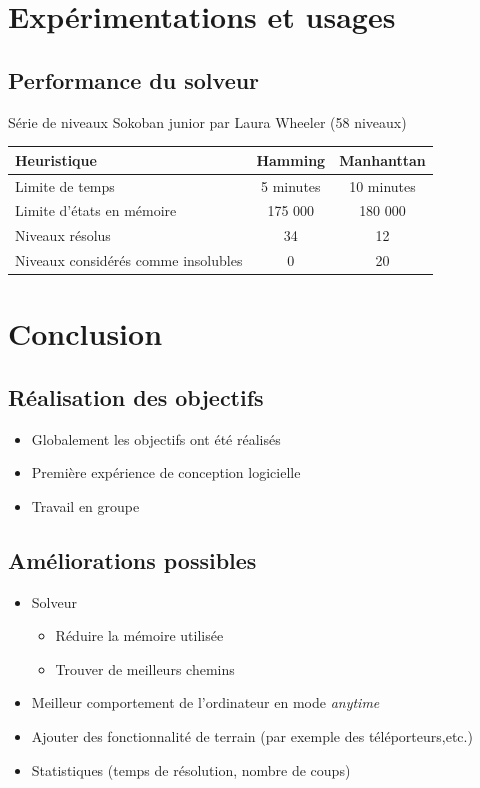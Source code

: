 \documentclass{beamer}
\begin{document}
\section{Expérimentations et usages}
\subsection{Performance du solveur}
\begin{frame}
  Série de niveaux Sokoban junior par Laura Wheeler (58 niveaux)
  \centering
  \begin{tabular}{|l|c|c|}
  \hline
  Heuristique                          & Hamming   & Manhanttan \\
  \hline
  Limite de temps                      & 5 minutes & 10 minutes \\
  \hline
  Limite d'états en mémoire            & 175 000   & 180 000    \\
  \hline
  Niveaux résolus                      &    34     &    12      \\
  \hline
  Niveaux considérés comme insolubles  &    0      &    20      \\
  \hline
  \end{tabular}
\end{frame}

\section{Conclusion}
\subsection{Réalisation des objectifs}
\begin{frame}
\begin{itemize}
\item Globalement les objectifs ont été réalisés
\item Première expérience de conception logicielle
\item Travail en groupe
\end{itemize}
\end{frame}

\subsection{Améliorations possibles}
\begin{frame}
\begin{itemize}
\item Solveur
\begin{itemize}
\item Réduire la mémoire utilisée
\item Trouver de meilleurs chemins
\end{itemize}
\item Meilleur comportement de l'ordinateur en mode \textit{anytime}
\item Ajouter des fonctionnalité de terrain (par exemple des téléporteurs,etc.)
\item Statistiques (temps de résolution, nombre de coups)
\end{itemize}
\end{frame}
\end{document}
